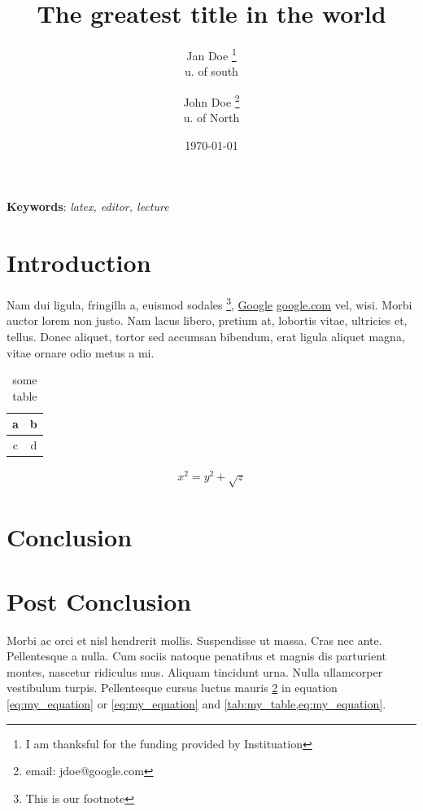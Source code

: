 \documentclass{article}
\title{The greatest title in the world}
\author{Jan Doe \thanks{I am thanksful for the funding provided by Instituation}\\u. of south \and John Doe \thanks{email: jdoe@google.com}\\u. of North}
\date{\today}
\begin{document}
\maketitle
\begin{abstract}
    \lipsum[1]
\end{abstract}

\textbf{Keywords}: \emph{latex, editor, lecture}

\section{Introduction}
    Nam dui ligula, fringilla a, euismod sodales \footnote{This is our footnote}, \href{www.google.com}{Google} \url{google.com} vel, wisi. Morbi auctor
lorem non justo. Nam lacus libero, pretium at, lobortis vitae, ultricies et, tellus.
Donec aliquet, tortor sed accumsan bibendum, erat ligula aliquet magna, vitae
ornare odio metus a mi. 
\clearpage
\begin{table}
    \centering
    \begin{tabular}{c|c}
        \hline
        a & b \\
        \hline
        c & d \\
        \hline
    \end{tabular}
    \caption{some table}
    \label{tab:my_table}
\end{table}
\begin{align}
    x^2=y^2+\sqrt{z}\label{eq:my_equation}
\end{align}


\section{Conclusion}\label{dog}
\lipsum[2-5]

\section{Post Conclusion}
Morbi ac orci et nisl hendrerit mollis. Suspendisse ut
massa. Cras nec ante. Pellentesque a nulla. Cum sociis natoque penatibus et
magnis dis parturient montes, nascetur ridiculus mus. Aliquam tincidunt urna.
Nulla ullamcorper vestibulum turpis. Pellentesque cursus luctus mauris \ref{dog} in equation \ref{eq:my_equation} or \eqref{eq:my_equation} and \cref{tab:my_table,eq:my_equation}.
\end{document}
